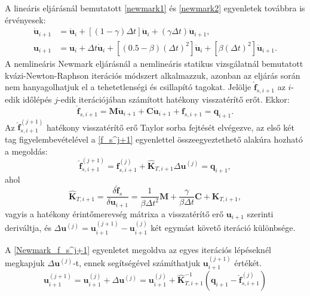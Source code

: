 A  lineáris eljárásnál bemutatott \eqref{newmark1} és \eqref{newmark2} egyenletek továbbra is érvényesek:
%
\begin{align*}
\mathbf{\dot{u}}_{i+1}& =  \mathbf{\dot{u}}_i+[(1-\gamma)\Delta{t}]\mathbf{\ddot{u}}_i+(\gamma\Delta{t})\mathbf{\ddot{u}}_{i+1},   \\ 
\mathbf{u}_{i+1}& =  \mathbf{u}_i+\Delta{t}\mathbf{\dot{u}}_i+\left[(0.5-\beta)
(\Delta{t})^2\right]\mathbf{\ddot{u}}_i+\left[\beta(\Delta{t})^2\right]\mathbf{\ddot{u}}_{i+1}. 
\end{align*}
%
A nemlineáris Newmark eljárásnál \cite{chopra} a nemlineáris statikus vizsgálatnál bemutatott kvázi-Newton-Raphson iterációs módszert alkalmazzuk, azonban az eljárás során nem hanyagolhatjuk el a tehetetlenségi és csillapító tagokat.  Jelölje $\mathbf{\hat{f}}_{s,i+1}$ az $i$-edik időlépés $j$-edik iterációjában számított hatékony visszatérítő erőt. Ekkor:
%
\begin{equation*}
 \mathbf{\hat{f}}_{s,i+1} = \mathbf{M}\mathbf{\ddot{u}}_{i+1}+\mathbf{C}\mathbf{\dot{u}}_{i+1}+\mathbf{f}_{s,i+1} = \mathbf{q}_{i+1}.
\end{equation*}
 Az $\mathbf{\hat{f}}_{s,i+1}^{(j+1)}$ hatékony visszatérítő erő Taylor sorba fejtését elvégezve, az első két tag figyelembevételével a \eqref{f_s^j+1}   egyenlettel összeegyeztethető alakúra hozható a megoldás:
 \begin{equation}
\label{Newmark_f_s^j+1}
\mathbf{\hat{f}}_{s,i+1}^{(j+1)} = \mathbf{f}_{s,i+1}^{(j)}+\mathbf{\hat{K}}_{T,i+1}\Delta{\mathbf{u}}^{(j)} = \mathbf{q}_{i+1},
\end{equation}
ahol
\begin{equation*}
\mathbf{\hat{K}}_{T,i+1} = \frac{\delta\mathbf{\hat{f}}_s}{\delta\mathbf{u}_{i+1}} = \frac{1}{\beta\Delta{t}^2}\mathbf{M}+\frac{\gamma}{\beta\Delta{t}}\mathbf{C}+\mathbf{K}_{T,i+1},
\end{equation*}
vagyis a hatékony érintőmerevség mátrixa a visszatérítő erő $\mathbf{u}_{i+1}$ szerinti deriváltja, és $\Delta{\mathbf{u}}^{(j)} = \mathbf{u}_{i+1}^{(j+1)}-\mathbf{u}_{i+1}^{(j)}$  két egymást követő iteráció különbsége.  

A \eqref{Newmark_f_s^j+1} egyenletet megoldva az egyes iterációs lépéseknél  megkapjuk $\Delta{\mathbf{u}}^{(j)}$-t, ennek segítségével számíthatjuk $\mathbf{u}_{i+1}^{(j+1)}$ értékét.
%
\begin{equation}
\label{Newmark_u_j+1}
\mathbf{u}_{i+1}^{(j+1)} = \mathbf{u}_{i+1}^{(j)}+\Delta{\mathbf{u}}^{(j)} =  \mathbf{u}_{i+1}^{(j)}+\mathbf{\hat{K}}_{T,i+1}^{-1}(\mathbf{q}_{i+1}-\mathbf{\hat{f}}_{s,i+1}^{(j)})
\end{equation}

